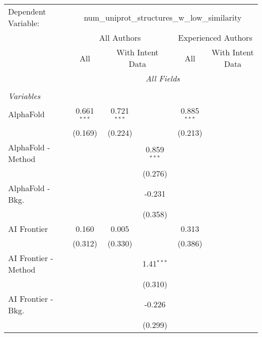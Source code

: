 \begingroup
\centering
\begin{tabular}{lcccccc}
   \tabularnewline \midrule \midrule
   Dependent Variable: & \multicolumn{6}{c}{num\_uniprot\_structures\_w\_low\_similarity}\\
 & \multicolumn{3}{c}{All Authors} & \multicolumn{3}{c}{Experienced Authors} \\
\cmidrule(lr){2-4} \cmidrule(lr){5-7}
 & \multicolumn{1}{c}{All} & \multicolumn{2}{c}{With Intent Data} & \multicolumn{1}{c}{All} & \multicolumn{2}{c}{With Intent Data} \\
\cmidrule(lr){2-2} \cmidrule(lr){3-4} \cmidrule(lr){5-5} \cmidrule(lr){6-7}
 & \multicolumn{6}{c}{\textit{All Fields}} \\ \\
   \emph{Variables}\\
   AlphaFold            & 0.661$^{***}$ & 0.721$^{***}$ &               & 0.885$^{***}$ &         &   \\   
                        & (0.169)       & (0.224)       &               & (0.213)       &         &   \\   
   AlphaFold - Method   &               &               & 0.859$^{***}$ &               &         &   \\   
                        &               &               & (0.276)       &               &         &   \\   
   AlphaFold - Bkg.     &               &               & -0.231        &               &         &   \\   
                        &               &               & (0.358)       &               &         &   \\   
   AI Frontier          & 0.160         & 0.005         &               & 0.313         &         &   \\   
                        & (0.312)       & (0.330)       &               & (0.386)       &         &   \\   
   AI Frontier - Method &               &               & 1.41$^{***}$  &               &         &   \\   
                        &               &               & (0.310)       &               &         &   \\   
   AI Frontier - Bkg.   &               &               & -0.226        &               &         &   \\   
                        &               &               & (0.299)       &               &         &   \\   

\end{tabular}
